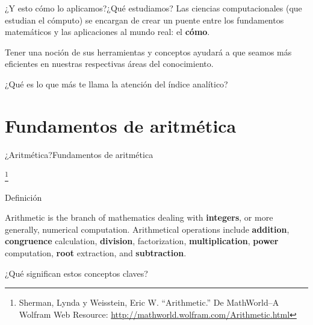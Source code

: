 \documentclass[spanish]{beamer}
\newcommand\blfootnote[1]{%
\begingroup
\renewcommand\thefootnote{}\footnote{#1}%
\addtocounter{footnote}{-1}%
\endgroup
}
\begin{document}
\begin{frame}{¿Y esto cómo lo aplicamos?}{¿Qué estudiamos?}
    Las \alert{ciencias computacionales} (que estudian el cómputo) se encargan de crear un puente entre los fundamentos matemáticos y las aplicaciones al mundo real: el \textbf{cómo}. \pause

    \bigskip

    Tener una noción de sus herramientas y conceptos ayudará a que seamos más eficientes en nuestras respectivas áreas del conocimiento. \pause

    \bigskip

    \begin{center}
        \Large
        ¿Qué es lo que más te llama la atención del índice analítico?
    \end{center}
\end{frame}

\section{Fundamentos de aritmética}

\begin{frame}{¿Aritmética?}{Fundamentos de aritmética}
    
    \blfootnote{Sherman, Lynda y Weisstein, Eric W. ``Arithmetic.'' De MathWorld--A Wolfram Web Resource: \url{http://mathworld.wolfram.com/Arithmetic.html}}

    \begin{block}{Definición}
        \begin{displayquote}
            Arithmetic is the branch of mathematics dealing with \textbf<2->{integers}, or more generally, \alert<2->{numerical computation}.
            Arithmetical operations include \textbf<2->{addition}, \textbf<2->{congruence} calculation, \textbf<2->{division}, factorization, \textbf<2->{multiplication}, \textbf<2->{power} computation, \textbf<2->{root} extraction, and \textbf<2->{subtraction}.
        \end{displayquote}
    \end{block} \pause
    
    \bigskip

    \begin{center}
        \Large
        ¿Qué significan estos conceptos claves?
    \end{center}
\end{frame}





\end{document}
